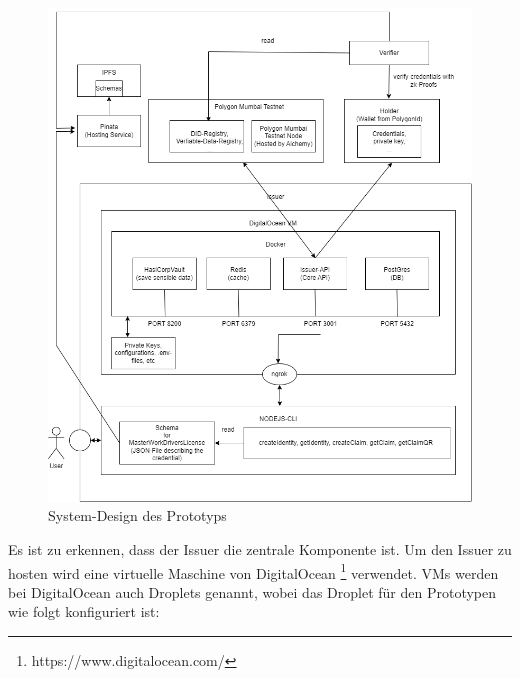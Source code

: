 \begin{figure}[h]
	\centering
	\includegraphics[scale=0.4]{media/system-design}
	\caption{System-Design des Prototyps}
	\label{fig:meine-grafik}
\end{figure}
Es ist zu erkennen, dass der Issuer die zentrale Komponente ist. Um den Issuer zu hosten wird eine virtuelle Maschine von DigitalOcean \footnote{https://www.digitalocean.com/} verwendet. VMs werden bei DigitalOcean auch Droplets genannt, wobei das Droplet für den Prototypen wie folgt konfiguriert ist:
